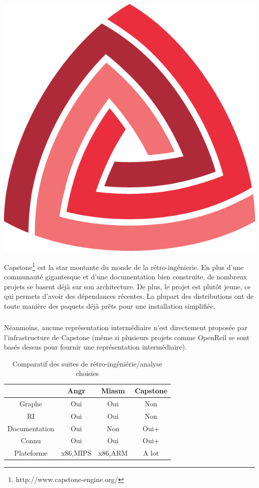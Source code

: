 \begin{center}
    \includegraphics[scale=0.3]{capstone.png}
\end{center}
Capstone\footnote{http://www.capstone-engine.org/} est la star montante du monde de la rétro-ingénierie. En plus d'une communauté gigantesque et d'une
documentation bien construite, de nombreux projets se basent déjà sur son architecture. De plus, le projet est plutôt jeune, ce qui permets d'avoir des
dépendances récentes. La plupart des distributions ont de toute manière des paquets déjà prêts pour une installation simplifiée.
\subparagraph{}
Néanmoins, aucune représentation intermédiaire n'est directement proposée par l'infrastructure de Capstone (même si plusieurs projets comme OpenReil se sont basés
dessus pour fournir une représentation intermédiaire).



\begin{table}[h]
    \centering
    \caption{Comparatif des suites de rétro-ingéniérie/analyse choisies}
    \label{itd}
    \begin{tabular}{c|c|c|c}
                      & Angr     & Miasm   & Capstone \\
        \hline
        Graphe        & Oui      & Oui     & Non      \\
        \hline
        RI            & Oui      & Oui     & Non      \\
        \hline
        Documentation & Oui      & Non     & Oui+     \\
        \hline
        Connu         & Oui      & Oui     & Oui+     \\
        \hline
        Plateforme    & x86,MIPS & x86,ARM & A lot
    \end{tabular}
\end{table}

